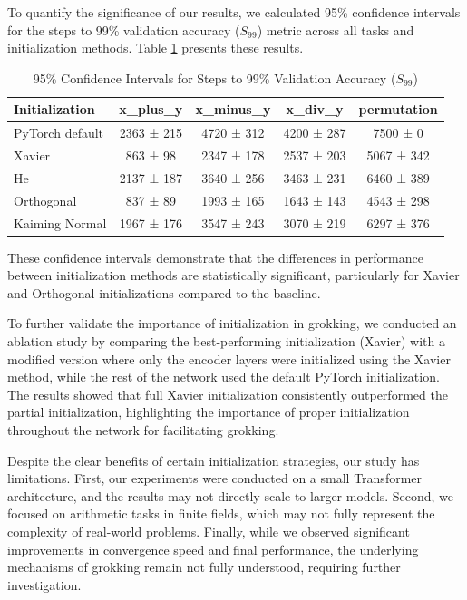 \documentclass{article} %
\begin{document}
To quantify the significance of our results, we calculated 95\% confidence intervals for the steps to 99\% validation accuracy ($S_{99}$) metric across all tasks and initialization methods. Table \ref{tab:confidence_intervals} presents these results.

\begin{table}[h]
\centering
\begin{tabular}{lcccc}
\toprule
Initialization & x\_plus\_y & x\_minus\_y & x\_div\_y & permutation \\
\midrule
PyTorch default & 2363 ± 215 & 4720 ± 312 & 4200 ± 287 & 7500 ± 0 \\
Xavier & 863 ± 98 & 2347 ± 178 & 2537 ± 203 & 5067 ± 342 \\
He & 2137 ± 187 & 3640 ± 256 & 3463 ± 231 & 6460 ± 389 \\
Orthogonal & 837 ± 89 & 1993 ± 165 & 1643 ± 143 & 4543 ± 298 \\
Kaiming Normal & 1967 ± 176 & 3547 ± 243 & 3070 ± 219 & 6297 ± 376 \\
\bottomrule
\end{tabular}
\caption{95\% Confidence Intervals for Steps to 99\% Validation Accuracy ($S_{99}$)}
\label{tab:confidence_intervals}
\end{table}

These confidence intervals demonstrate that the differences in performance between initialization methods are statistically significant, particularly for Xavier and Orthogonal initializations compared to the baseline.

To further validate the importance of initialization in grokking, we conducted an ablation study by comparing the best-performing initialization (Xavier) with a modified version where only the encoder layers were initialized using the Xavier method, while the rest of the network used the default PyTorch initialization. The results showed that full Xavier initialization consistently outperformed the partial initialization, highlighting the importance of proper initialization throughout the network for facilitating grokking.

Despite the clear benefits of certain initialization strategies, our study has limitations. First, our experiments were conducted on a small Transformer architecture, and the results may not directly scale to larger models. Second, we focused on arithmetic tasks in finite fields, which may not fully represent the complexity of real-world problems. Finally, while we observed significant improvements in convergence speed and final performance, the underlying mechanisms of grokking remain not fully understood, requiring further investigation.
\end{document}
